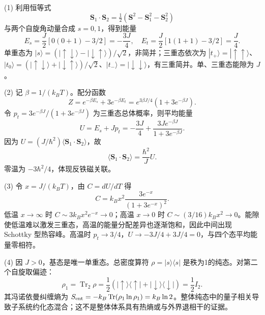 (1) 利用恒等式
\[
\boldsymbol S_1\cdot\boldsymbol S_2
=\tfrac12(\boldsymbol S^2-\boldsymbol S_1^2-\boldsymbol S_2^2)
\]
与两个自旋角动量合成 \(s=0,1\)，得到能量
\[
E_s=\frac J2[0(0+1)-3/2]=-\frac{3J}{4},\quad
E_t=\frac J2[1(1+1)-3/2]=\frac J4 .
\]
单重态为 \(|s\rangle=(|\uparrow\downarrow\rangle-|\downarrow\uparrow\rangle)/\sqrt2\)，非简并；三重态依次为 \(|t_+\rangle=|\uparrow\uparrow\rangle\)、\(|t_0\rangle=(|\uparrow\downarrow\rangle+|\downarrow\uparrow\rangle)/\sqrt2\)、\(|t_-\rangle=|\downarrow\downarrow\rangle\)，有三重简并。单、三重态能隙为 \(J\)。

(2) 记 \(\beta=1/(k_BT)\)。配分函数
\[
Z=e^{-\beta E_s}+3e^{-\beta E_t}
=e^{3\beta J/4}(1+3e^{-\beta J}).
\]
令 \(p_t=3e^{-\beta J}/(1+3e^{-\beta J})\) 为三重态总体概率，则平均能量
\[
U=E_s+Jp_t=-\frac{3J}{4}+\frac{3Je^{-\beta J}}{1+3e^{-\beta J}}.
\]
因为 \(U=(J/\hbar^2)\langle\boldsymbol S_1\cdot\boldsymbol S_2\rangle\)，故
\[
\langle\boldsymbol S_1\cdot\boldsymbol S_2\rangle=\frac{\hbar^2}{J}U.
\]
零温为 \(-3\hbar^2/4\)，体现反铁磁关联。

(3) 令 \(x=J/(k_BT)\)，由 \(C=dU/dT\) 得
\[
C=k_Bx^2\frac{3e^{-x}}{(1+3e^{-x})^2}.
\]
低温 \(x\to\infty\) 时 \(C\sim3k_Bx^2e^{-x}\to0\)；高温 \(x\to0\) 时 \(C\sim(3/16)k_Bx^2\to0\)。能隙使低温难以激发三重态，高温的能量分配差异也逐渐饱和，因此中间出现 Schottky 型热容峰。高温时 \(p_t\to3/4\)，\(U\to-3J/4+3J/4=0\)，与四个态平均能量零相符。

(4) 因 \(J>0\)，基态是唯一单重态。总密度算符 \(\rho=|s\rangle\langle s|\) 是秩为1的纯态。对第二个自旋取偏迹：
\[
\rho_1=\operatorname{Tr}_2\rho
=\frac12\left(|\uparrow\rangle\langle\uparrow|+
|\downarrow\rangle\langle\downarrow|\right)
=\frac12I_2.
\]
其冯诺依曼纠缠熵为 \(S_{\rm ent}=-k_B\operatorname{Tr}(\rho_1\ln\rho_1)=k_B\ln2\)。整体纯态中的量子相关导致子系统约化态混合；这不是整体体系具有热熵或与外界退相干的证据。
